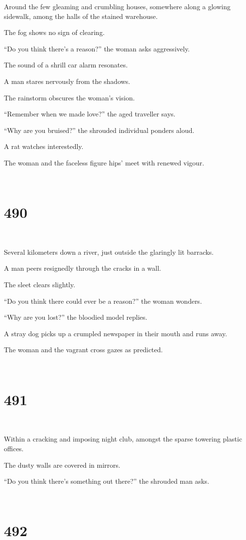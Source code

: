 \documentclass{report}
\begin{document}
Around the few gleaming and crumbling houses, somewhere along a glowing sidewalk, among the halls of the stained warehouse.

The fog shows no sign of clearing.

``Do you think there's a reason?'' the woman asks aggressively.

The sound of a shrill car alarm resonates.

A man stares nervously from the shadows.

The rainstorm obscures the woman's vision.

``Remember when we made love?'' the aged traveller says.

``Why are you bruised?'' the shrouded individual ponders aloud.

A rat watches interestedly.

The woman and the faceless figure hips' meet with renewed vigour.

~
\chapter*{490}
~

Several kilometers down a river, just outside the glaringly lit barracks.

A man peers resignedly through the cracks in a wall.

The sleet clears slightly.

``Do you think there could ever be a reason?'' the woman wonders.

``Why are you lost?'' the bloodied model replies.

A stray dog picks up a crumpled newspaper in their mouth and runs away.

The woman and the vagrant cross gazes as predicted.

~
\chapter*{491}
~

Within a cracking and imposing night club, amongst the sparse towering plastic offices.

The dusty walls are covered in mirrors.

``Do you think there's something out there?'' the shrouded man asks.

~
\chapter*{492}
~
\end{document}

